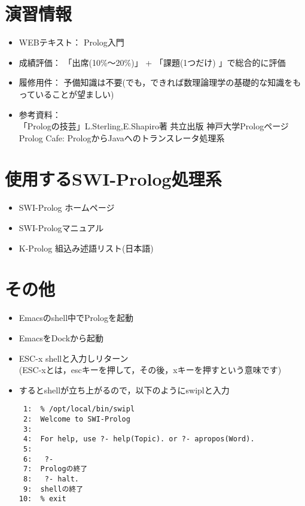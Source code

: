 \documentclass[a4j]{article}
\begin{document}
\section*{演習情報}
\label{sec-5}
\begin{itemize}

\item WEBテキスト： Prolog入門
\label{sec-5-1}%

\item 成績評価： 「出席(10\%〜20\%)」 + 「課題(1つだけ) 」で総合的に評価
\label{sec-5-2}%

\item 履修用件： 予備知識は不要(でも，できれば数理論理学の基礎的な知識をもっていることが望ましい)
\label{sec-5-3}%

\item 参考資料：\\
\label{sec-5-4}%
「Prologの技芸」L.Sterling,E.Shapiro著 共立出版
  神戸大学Prologページ
 Prolog Cafe: PrologからJavaへのトランスレータ処理系



\end{itemize} %
\section*{使用するSWI-Prolog処理系}
\label{sec-6}
\begin{itemize}

\item SWI-Prolog ホームページ
\label{sec-6-1}%

\item SWI-Prologマニュアル
\label{sec-6-2}%

\item K-Prolog 組込み述語リスト(日本語)
\label{sec-6-3}%

\end{itemize} %
\section*{その他}
\label{sec-7}
\begin{itemize}

\item Emacsのshell中でPrologを起動
\label{sec-7-1}%

\item EmacsをDockから起動
\label{sec-7-2}%

\item ESC-x shellと入力しリターン\\
\label{sec-7-3}%
(ESC-xとは，escキーを押して，その後，xキーを押すという意味です)

\item するとshellが立ち上がるので，以下のようにswiplと入力\\
\label{sec-7-4}%
\begin{verbatim}
 1:  % /opt/local/bin/swipl
 2:  Welcome to SWI-Prolog
 3:  
 4:  For help, use ?- help(Topic). or ?- apropos(Word).
 5:  
 6:   ?- 
 7:  Prologの終了
 8:   ?- halt.
 9:  shellの終了
10:  % exit
\end{verbatim}

\end{itemize} %
\end{document}
